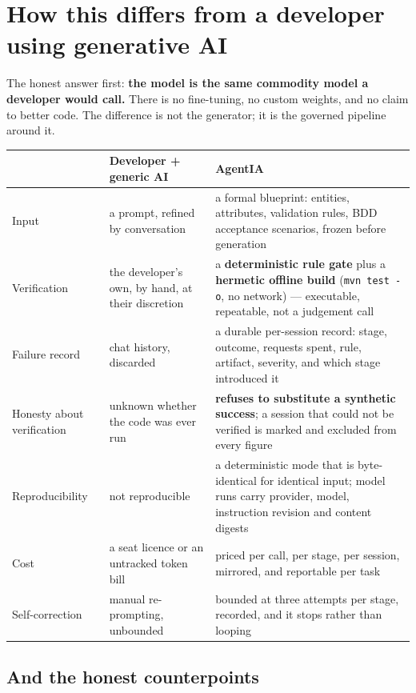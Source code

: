 \documentclass[11pt,a4paper]{article}
\begin{document}
\section{How this differs from a developer using generative AI}

The honest answer first: \textbf{the model is the same commodity model a developer
would call.} There is no fine-tuning, no custom weights, and no claim to better code.
The difference is not the generator; it is the governed pipeline around it.

\begin{center}
\begin{tabular}{@{}p{}p{}p{}@{}}
\toprule
& \textbf{Developer + generic AI} & \textbf{AgentIA} \\
\midrule
Input & a prompt, refined by conversation & a formal blueprint: entities,
attributes, validation rules, BDD acceptance scenarios, frozen before generation \\
Verification & the developer's own, by hand, at their discretion & a
\textbf{deterministic rule gate} plus a \textbf{hermetic offline build}
(\texttt{mvn test -o}, no network) --- executable, repeatable, not a judgement call \\
Failure record & chat history, discarded & a durable per-session record: stage,
outcome, requests spent, rule, artifact, severity, and which stage introduced it \\
Honesty about verification & unknown whether the code was ever run & \textbf{refuses
to substitute a synthetic success}; a session that could not be verified is marked
and excluded from every figure \\
Reproducibility & not reproducible & a deterministic mode that is byte-identical for
identical input; model runs carry provider, model, instruction revision and content
digests \\
Cost & a seat licence or an untracked token bill & priced per call, per stage, per
session, mirrored, and reportable per task \\
Self-correction & manual re-prompting, unbounded & bounded at three attempts per
stage, recorded, and it stops rather than looping \\
\bottomrule
\end{tabular}
\end{center}

\subsection{And the honest counterpoints}
\end{document}
